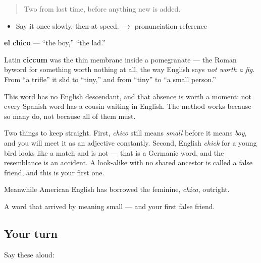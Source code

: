 \label{lesson:ES-C308-chico}



\begin{quote}
Two from last time, before anything new is added.
\end{quote}

\begin{sounds}
\begin{itemize}
\raggedright
  \item Say it once slowly, then at speed. $\to$ pronunciation reference
\end{itemize}
\end{sounds}

\begin{cousinweb}
\textbf{el chico} --- \textquotedblleft{}the boy,\textquotedblright{} \textquotedblleft{}the lad.\textquotedblright{}

Latin \textbf{ciccum} was the thin membrane inside a pomegranate --- the Roman byword for something worth nothing at all, the way English says \emph{not worth a fig}. From \textquotedblleft{}a trifle\textquotedblright{} it slid to \textquotedblleft{}tiny,\textquotedblright{} and from \textquotedblleft{}tiny\textquotedblright{} to \textquotedblleft{}a small person.\textquotedblright{}

This word has no English descendant, and that absence is worth a moment: not every Spanish word has a cousin waiting in English. The method works because so many do, not because all of them must.

Two things to keep straight. First, \emph{chico} still means \emph{small} before it means \emph{boy}, and you will meet it as an adjective constantly. Second, English \emph{chick} for a young bird looks like a match and is not --- that is a Germanic word, and the resemblance is an accident. A look-alike with no shared ancestor is called a false friend, and this is your first one.

Meanwhile American English has borrowed the feminine, \emph{chica}, outright.
\end{cousinweb}

\begin{grammarlens}[title={What you've built}]
A word that arrived by meaning small --- and your first false friend.
\end{grammarlens}

\subsection*{Your turn}
Say these aloud:

